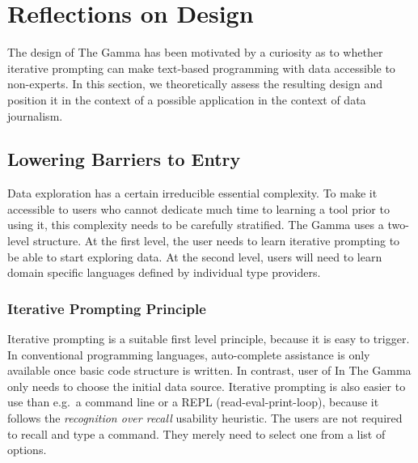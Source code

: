 \documentclass[manuscript,review,anonymous]{acmart}
\begin{document}


\section{Reflections on Design}
\label{sec:design}

The design of The Gamma has been motivated by a curiosity as to whether iterative
prompting can make text-based programming with data accessible to non-experts. In this section,
we theoretically assess the resulting design and position it in the context of a possible application
in the context of data journalism.

\subsection{Lowering Barriers to Entry}
\label{sec:design-bar}

Data exploration has a certain irreducible essential complexity. To make it accessible to users who
cannot dedicate much time to learning a tool prior to using it, this complexity needs to be
carefully stratified. The Gamma uses a two-level structure. At the first level, the user needs
to learn iterative prompting to be able to start exploring data. At the second level, users will
need to learn domain specific languages defined by individual type providers.

\subsubsection*{Iterative Prompting Principle}
Iterative prompting is a suitable first level principle, because it is easy to trigger.
In conventional programming languages, auto-complete assistance is only available once basic
code structure is written. In contrast, user of In The Gamma only needs to choose the initial
data source. Iterative prompting is also easier to use than e.g.~a command line or a REPL
(read-eval-print-loop), because it follows the \emph{recognition over recall} usability heuristic.
The users are not required to recall and type a command. They merely need to select one from a
list of options.
\end{document}
